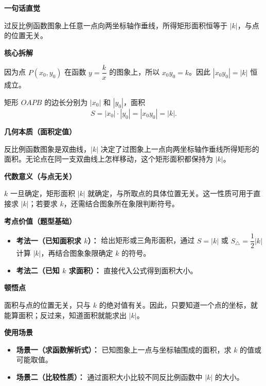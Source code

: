\begin{explanationbox}
	\textbf{\textcolor{CExplanation}{一句话直觉}}

	过反比例函数图象上任意一点向两坐标轴作垂线，所得矩形面积恒等于 $|k|$，与点的位置无关。

	\medskip
	\textbf{\textcolor{CExplanation}{核心拆解}}
	\begin{description}[style=nextline, leftmargin=2.8em, labelsep=0.5em, itemsep=0.45em]
		\item[\textbf{要点一（坐标乘积恒定）：}]
		      因为点 $P(x_0,y_0)$ 在函数 $y=\dfrac{k}{x}$ 的图象上，所以 $x_0y_0=k$。因此 $|x_0y_0|=|k|$ 恒成立。
		\item[\textbf{要点二（面积与坐标关系）：}]
		      矩形 $OAPB$ 的边长分别为 $|x_0|$ 和 $|y_0|$，面积
		      \[
			      S=|x_0|\cdot |y_0|=|x_0y_0|=|k|.
		      \]
	\end{description}

	\medskip
	\textbf{\textcolor{CExplanation}{几何本质（面积定值）}}

	反比例函数图象是双曲线，$|k|$ 决定了过图象上一点向两坐标轴作垂线所得矩形的面积。无论点在同一支双曲线上怎样移动，这个矩形面积都保持为 $|k|$。

	\medskip
	\textbf{\textcolor{CExplanation}{代数意义（与点无关）}}

	$k$ 一旦确定，矩形面积 $|k|$ 就确定，与所取点的具体位置无关。这一性质可用于直接求 $|k|$；若要求 $k$，还需结合图象所在象限判断符号。

	\medskip
	\textbf{\textcolor{CExplanation}{考点价值（题型基础）}}
	\begin{itemize}[leftmargin=*, itemsep=0.5em, topsep=0.4em]
		\item \textbf{考法一（已知面积求 $k$）：} 给出矩形或三角形面积，通过 $S=|k|$ 或 $S_{\triangle}=\dfrac{1}{2}|k|$ 计算 $|k|$，再结合图象象限确定 $k$ 的符号。
		\item \textbf{考法二（已知 $k$ 求面积）：} 直接代入公式得到面积大小。
	\end{itemize}

	\medskip
	\textbf{\textcolor{CExplanation}{顿悟点}}

	面积与点的位置无关，只与 $k$ 的绝对值有关。因此，只要知道一个点的坐标，就能算面积；反过来，知道面积就能求出 $|k|$。

	\medskip
	\textbf{\textcolor{CExplanation}{使用场景}}
	\begin{itemize}[leftmargin=*, itemsep=0.5em, topsep=0.4em]
		\item \textbf{场景一（求函数解析式）：} 已知图象上一点与坐标轴围成的面积，求 $k$ 的值或可能取值。
		\item \textbf{场景二（比较性质）：} 通过面积大小比较不同反比例函数中 $|k|$ 的大小。
	\end{itemize}
\end{explanationbox}
